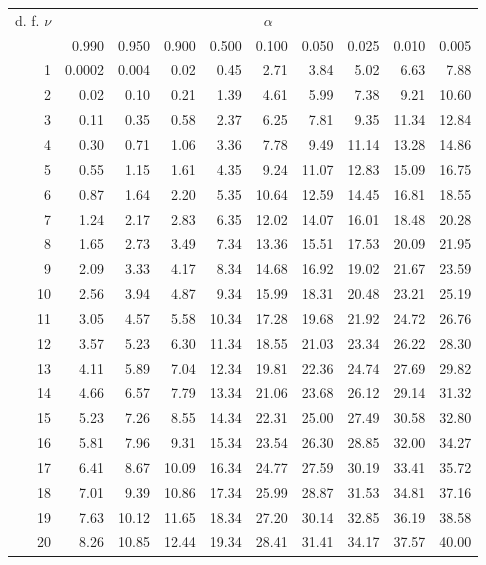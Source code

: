 \begin{mvtable}
{
\begin{tabular}{r|*{9}{r}}
\toprule
\makecell{d. f.\\$\nu$} & \multicolumn{9}{c}{$\alpha$}\\
\cmidrule(lr){2-10}
& 0.990 & 0.950 & 0.900 & 0.500 & 0.100 & 0.050 & 0.025 & 0.010 & 0.005\\
\midrule
1 & 0.0002 & 0.004 & 0.02 & 0.45 & 2.71 & 3.84 & 5.02 & 6.63 & 7.88\\
2 & 0.02 & 0.10 & 0.21 & 1.39 & 4.61 & 5.99 & 7.38 & 9.21 & 10.60\\
3 & 0.11 & 0.35 & 0.58 & 2.37 & 6.25 & 7.81 & 9.35 & 11.34 & 12.84\\
4 & 0.30 & 0.71 & 1.06 & 3.36 & 7.78 & 9.49 & 11.14 & 13.28 & 14.86\\
5 & 0.55 & 1.15 & 1.61 & 4.35 & 9.24 & 11.07 & 12.83 & 15.09 & 16.75\\
6 & 0.87 & 1.64 & 2.20 & 5.35 & 10.64 & 12.59 & 14.45 & 16.81 & 18.55\\
7 & 1.24 & 2.17 & 2.83 & 6.35 & 12.02 & 14.07 & 16.01 & 18.48 & 20.28\\
8 & 1.65 & 2.73 & 3.49 & 7.34 & 13.36 & 15.51 & 17.53 & 20.09 & 21.95\\
9 & 2.09 & 3.33 & 4.17 & 8.34 & 14.68 & 16.92 & 19.02 & 21.67 & 23.59\\
10 & 2.56 & 3.94 & 4.87 & 9.34 & 15.99 & 18.31 & 20.48 & 23.21 & 25.19\\
11 & 3.05 & 4.57 & 5.58 & 10.34 & 17.28 & 19.68 & 21.92 & 24.72 & 26.76\\
12 & 3.57 & 5.23 & 6.30 & 11.34 & 18.55 & 21.03 & 23.34 & 26.22 & 28.30\\
13 & 4.11 & 5.89 & 7.04 & 12.34 & 19.81 & 22.36 & 24.74 & 27.69 & 29.82\\
14 & 4.66 & 6.57 & 7.79 & 13.34 & 21.06 & 23.68 & 26.12 & 29.14 & 31.32\\
15 & 5.23 & 7.26 & 8.55 & 14.34 & 22.31 & 25.00 & 27.49 & 30.58 & 32.80\\
16 & 5.81 & 7.96 & 9.31 & 15.34 & 23.54 & 26.30 & 28.85 & 32.00 & 34.27\\
17 & 6.41 & 8.67 & 10.09 & 16.34 & 24.77 & 27.59 & 30.19 & 33.41 & 35.72\\
18 & 7.01 & 9.39 & 10.86 & 17.34 & 25.99 & 28.87 & 31.53 & 34.81 & 37.16\\
19 & 7.63 & 10.12 & 11.65 & 18.34 & 27.20 & 30.14 & 32.85 & 36.19 & 38.58\\
20 & 8.26 & 10.85 & 12.44 & 19.34 & 28.41 & 31.41 & 34.17 & 37.57 & 40.00\\

\end{tabular}}
\end{mvtable}

